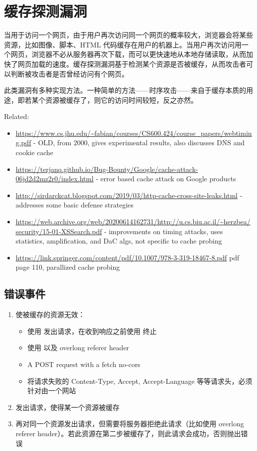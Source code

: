 \section{缓存探测漏洞}

当用于访问一个网页，由于用户再次访问同一个网页的概率较大，浏览器会将某些资源，比如图像、脚本、HTML 代码缓存在用户的机器上。当用户再次访问用一个网页，浏览器不必从服务器再次下载，而可以更快速地从本地存储读取，从而加快了网页加载的速度。缓存探测漏洞基于检测某个资源是否被缓存，从而攻击者可以判断被攻击者是否曾经访问有个网页。

此类漏洞有多种实现方法。一种简单的方法——时序攻击——来自于缓存本质的用途，即若某个资源被缓存了，则它的访问时间较短，反之亦然。


Related:

\begin{itemize}
    \item \url{https://www.cs.jhu.edu/~fabian/courses/CS600.424/course_papers/webtiming.pdf} - OLD, from 2000, gives experimental results, also discusses DNS and cookie cache
    \item \url{https://terjanq.github.io/Bug-Bounty/Google/cache-attack-06jd2d2mz2r0/index.html} - error based cache attack on Google products
    \item \url{http://sirdarckcat.blogspot.com/2019/03/http-cache-cross-site-leaks.html} - addresses some basic defense strategies
    \item \url{https://web.archive.org/web/20200614162731/http://u.cs.biu.ac.il/~herzbea/security/15-01-XSSearch.pdf} - improvements on timing attacks, uses statistics, amplification, and DaC algs, not specific to cache probing
    \item \url{https://link.springer.com/content/pdf/10.1007/978-3-319-18467-8.pdf} pdf page 110, parallized cache probing
\end{itemize}

\subsection{错误事件}

\begin{enumerate}
    \item 使被缓存的资源无效：
    \begin{itemize}
        \item 使用  发出请求，在收到响应之前使用  终止
        \item 使用  以及 overlong referer header
        \item A POST request with a fetch no-cors
        \item 将请求失败的 Content-Type, Accept, Accept-Language 等等请求头，必须针对由一个网站
    \end{itemize}
    \item 发出请求，使得某一个资源被缓存
    \item 再对同一个资源发出请求，但需要将服务器拒绝此请求（比如使用 overlong referer header）。若此资源在第二步被缓存了，则此请求会成功，否则抛出错误
\end{enumerate}

